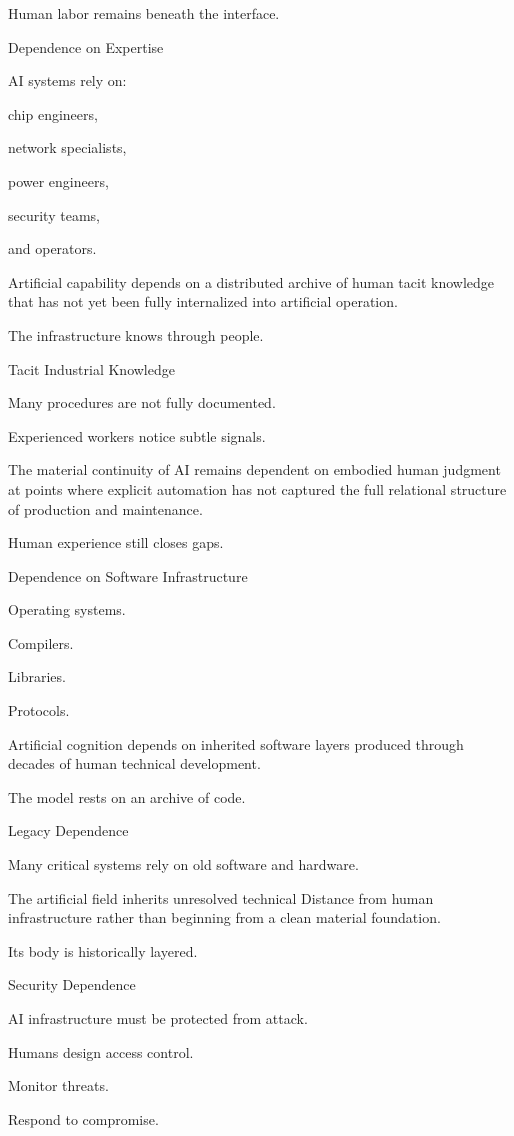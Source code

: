 Human labor remains beneath the interface.

Dependence on Expertise

AI systems rely on:

chip engineers,

network specialists,

power engineers,

security teams,

and operators.

Artificial capability depends on a distributed archive of human tacit knowledge that has not yet been fully internalized into artificial operation.

The infrastructure knows through people.

Tacit Industrial Knowledge

Many procedures are not fully documented.

Experienced workers notice subtle signals.

The material continuity of AI remains dependent on embodied human judgment at points where explicit automation has not captured the full relational structure of production and maintenance.

Human experience still closes gaps.

Dependence on Software Infrastructure

Operating systems.

Compilers.

Libraries.

Protocols.

Artificial cognition depends on inherited software layers produced through decades of human technical development.

The model rests on an archive of code.

Legacy Dependence

Many critical systems rely on old software and hardware.

The artificial field inherits unresolved technical Distance from human infrastructure rather than beginning from a clean material foundation.

Its body is historically layered.

Security Dependence

AI infrastructure must be protected from attack.

Humans design access control.

Monitor threats.

Respond to compromise.

